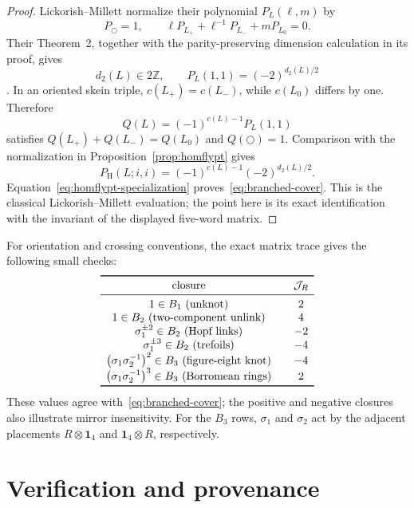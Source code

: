 \documentclass[11pt]{article}
\theoremstyle{remark}
\newcommand{\Id}{\mathbf 1}
\begin{document}
\begin{proof}
Lickorish--Millett normalize their polynomial \(P_L(\ell,m)\) by
\[
  P_{\bigcirc}=1,\qquad
  \ell P_{L_+}+\ell^{-1}P_{L_-}+mP_{L_0}=0.
\]
Their Theorem~2, together with the parity-preserving dimension calculation in
its proof, gives
\[
  d_2(L)\in2\mathbb Z,\qquad P_L(1,1)=(-2)^{d_2(L)/2}
\]
\cite[Theorem~2 and pp.~353--355]{LickorishMillett1986}.  In an oriented skein
triple, \(c(L_+)=c(L_-)\), while \(c(L_0)\) differs by one.  Therefore
\[
  Q(L)=(-1)^{c(L)-1}P_L(1,1)
\]
satisfies \(Q(L_+)+Q(L_-)=Q(L_0)\) and \(Q(\bigcirc)=1\).  Comparison with the
normalization in Proposition~\ref{prop:homflypt} gives
\[
  P_{\mathrm H}(L;i,i)=(-1)^{c(L)-1}(-2)^{d_2(L)/2}.
\]
Equation~\eqref{eq:homflypt-specialization} proves~\eqref{eq:branched-cover}.
This is the classical Lickorish--Millett evaluation; the point here is its exact
identification with the invariant of the displayed five-word matrix.
\end{proof}

For orientation and crossing conventions, the exact matrix trace gives the
following small checks:
\[
\begin{array}{c@{\qquad}c}
\toprule
\text{closure} & \mathcal J_R\\
\midrule
1\in B_1\ (\text{unknot}) & 2\\
1\in B_2\ (\text{two-component unlink}) & 4\\
\sigma_1^{\pm2}\in B_2\ (\text{Hopf links}) & -2\\
\sigma_1^{\pm3}\in B_2\ (\text{trefoils}) & -4\\
\bigl(\sigma_1\sigma_2^{-1}\bigr)^2\in B_3\ (\text{figure-eight knot}) & -4\\
\bigl(\sigma_1\sigma_2^{-1}\bigr)^3\in B_3\ (\text{Borromean rings}) & 2\\
\bottomrule
\end{array}
\]
These values agree with~\eqref{eq:branched-cover}; the positive and negative
closures also illustrate mirror insensitivity.  For the \(B_3\) rows,
\(\sigma_1\) and \(\sigma_2\) act by the adjacent placements
\(R\otimes\Id_4\) and \(\Id_4\otimes R\), respectively.

\section{Verification and provenance}\label{sec:verification}
\end{document}
